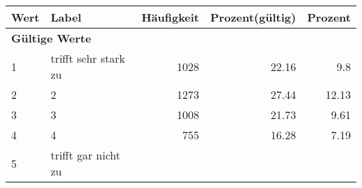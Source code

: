      \begin{longtable}{lXrrr}
     \toprule
     \textbf{Wert} & \textbf{Label} & \textbf{Häufigkeit} & \textbf{Prozent(gültig)} & \textbf{Prozent} \\
     \endhead
     \midrule
     \multicolumn{5}{l}{\textbf{Gültige Werte}}\\

     1 &
     \multicolumn{1}{X}{ trifft sehr stark zu   } &


       \num{1028} &
       \num[round-mode=places,round-precision=2]{22.16} &
         \num[round-mode=places,round-precision=2]{9.8} \\

     2 &
     \multicolumn{1}{X}{ 2   } &


       \num{1273} &
       \num[round-mode=places,round-precision=2]{27.44} &
         \num[round-mode=places,round-precision=2]{12.13} \\

     3 &
     \multicolumn{1}{X}{ 3   } &


       \num{1008} &
       \num[round-mode=places,round-precision=2]{21.73} &
         \num[round-mode=places,round-precision=2]{9.61} \\

     4 &
     \multicolumn{1}{X}{ 4   } &


       \num{755} &
       \num[round-mode=places,round-precision=2]{16.28} &
         \num[round-mode=places,round-precision=2]{7.19} \\

     5 &
     \multicolumn{1}{X}{ trifft gar nicht zu   } &



\end{longtable}

